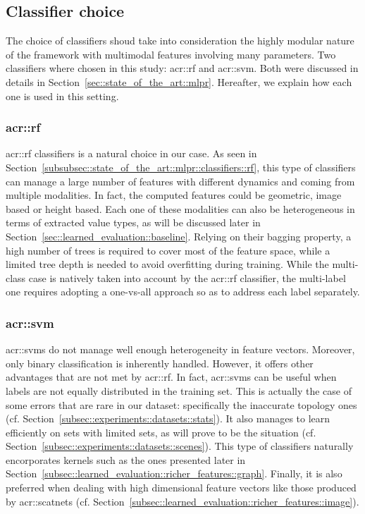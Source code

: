     \subsection{Classifier choice}
        \label{subsec::learned_evaluation::classification::classifiers}
        The choice of classifiers shoud take into consideration the highly modular nature of the framework with multimodal features involving many parameters.
        Two classifiers where chosen in this study: \gls{acr::rf} and \gls{acr::svm}.
        Both were discussed in details in Section~\ref{sec::state_of_the_art::mlpr}.
        Hereafter, we explain how each one is used in this setting.\\

        \subsubsection{\acrlong*{acr::rf}}
            \gls{acr::rf} classifiers is a natural choice in our case.
            As seen in Section~\ref{subsubsec::state_of_the_art::mlpr::classifiers::rf}, this type of classifiers can manage a large number of features with different dynamics and coming from multiple modalities.
            In fact, the computed features could be geometric, image based or height based.
            Each one of these modalities can also be heterogeneous in terms of extracted value types, as will be discussed later in Section~\ref{sec::learned_evaluation::baseline}.
            Relying on their bagging property, a high number of trees is required to cover most of the feature space, while a limited tree depth is needed to avoid overfitting during training.
            While the multi-class case is natively taken into account by the \gls{acr::rf} classifier, the multi-label one requires adopting a one-vs-all approach so as to address each label separately.

        \subsubsection{\acrshort*{acr::svm}}
            \glspl{acr::svm} do not manage well enough heterogeneity in feature vectors.
            Moreover, only binary classification is inherently handled.
            However, it offers other advantages that are not met by \gls{acr::rf}.
            In fact, \glspl{acr::svm} can be useful when labels are not equally distributed in the training set.
            This is actually the case of some errors that are rare in our dataset: specifically the inaccurate topology ones (cf. Section~\ref{subsec::experiments::datasets::stats}).
            It also manages to learn efficiently on sets with limited sets, as will prove to be the situation (cf. Section~\ref{subsec::experiments::datasets::scenes}). 
            This type of classifiers naturally encorporates kernels such as the ones presented later in Section~\ref{subsec::learned_evaluation::richer_features::graph}.
            Finally, it is also preferred when dealing with high dimensional feature vectors like those produced by \glspl{acr::scatnet} (cf. Section~\ref{subsec::learned_evaluation::richer_features::image}).

